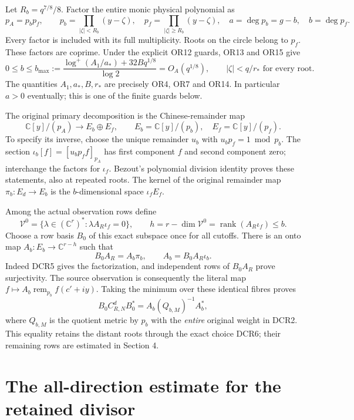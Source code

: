 \documentclass[11pt]{article}
\newcommand{\C}{\mathbb C}
\newcommand{\lp}{\log^+}
\begin{document}
Let \(R_b=q^{7/8}/8\). Factor the entire monic physical polynomial as
\[
p_A=p_b p_f,\qquad
p_b=\prod_{|\zeta|<R_b}(y-\zeta),\quad
p_f=\prod_{|\zeta|\ge R_b}(y-\zeta),\quad
a=\deg p_b=g-b,\quad b=\deg p_f.
\tag{DCR3}
\]
Every factor is included with its full multiplicity. Roots on the
circle belong to \(p_f\). These factors are coprime. Under the explicit
OR12 guards, OR13 and OR15 give
\[
0\le b\le b_{\max}:=
 \frac{\lp(A_1/a_*)+32Bq^{1/8}}{\log2}=O_A(q^{1/8}),
\qquad |\zeta|<q/r_* \text{ for every root}.
\tag{DCR4}
\]
The quantities \(A_1,a_*,B,r_*\) are precisely OR4, OR7 and OR14.
In particular \(a>0\) eventually; this is one of the finite guards below.

The original primary decomposition is the Chinese-remainder map
\[
\C[y]/(p_A)\longrightarrow E_b\oplus E_f,\qquad
E_b=\C[y]/(p_b),\quad E_f=\C[y]/(p_f).
\tag{DCR5}
\]
To specify its inverse, choose the unique remainder \(u_b\) with
\(u_b p_f=1\bmod p_b\). The section
\(\iota_b[f]=[u_b p_f f]_{p_A}\) has first component \(f\)
and second component zero; interchange the factors for \(\iota_f\).
Bezout's polynomial division identity proves these statements,
also at repeated roots. The kernel of the original remainder map
\(\pi_b:E_d\to E_b\) is the \(b\)-dimensional space \(\iota_f E_f\).

Among the actual observation rows define
\[
\mathcal V^0=\{\lambda\in(\C^r)^*:
          \lambda A_R\iota_f=0\},\qquad
h=r-\dim\mathcal V^0=\operatorname{rank}(A_R\iota_f)\le b.
\tag{DCR6}
\]
Choose a row basis \(B_0\) of this exact subspace once for all cutoffs.
There is an onto map \(A_b:E_b\to\C^{r-h}\) such that
\[
 B_0A_R=A_b\pi_b,\qquad A_b=B_0A_R\iota_b.
\tag{DCR7}
\]
Indeed DCR5 gives the factorization, and independent rows of \(B_0A_R\)
prove surjectivity. The source observation is consequently the
literal map \(f\mapsto A_b\operatorname{rem}_{p_b}f(c'+iy)\).
Taking the minimum over these identical fibres proves
\[
B_0C_{R,N}^dB_0^*=A_b(Q_{b,M})^{-1}A_b^*,
\tag{DCR8}
\]
where \(Q_{b,M}\) is the quotient metric by \(p_b\) with the
\emph{entire} original weight in DCR2. This equality retains the
distant roots through the exact choice DCR6; their remaining rows
are estimated in Section 4.

\section{The all-direction estimate for the retained divisor}
\end{document}
